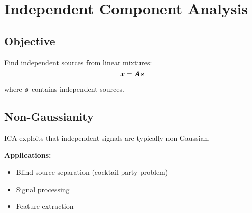 
\section{Independent Component Analysis }
\label{sec:ica}

\subsection{Objective}

Find independent sources from linear mixtures:
\begin{equation}
\boldsymbol{x} = \boldsymbol{A}\boldsymbol{s}
\end{equation}

where $\boldsymbol{s}$ contains independent sources.

\subsection{Non-Gaussianity}

ICA exploits that independent signals are typically non-Gaussian.

\textbf{Applications:}
\begin{itemize}
    \item Blind source separation (cocktail party problem)
    \item Signal processing
    \item Feature extraction
\end{itemize}





